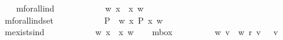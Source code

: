 \begin{isabellebody}
\ \ \isamarkupfalse%
\ mforall{\isacharunderscore}ind\ {\isacharcolon}{\isacharcolon}\ {\isachardoublequoteopen}{\isacharparenleft}{\isasymmu}\ {\isasymRightarrow}\ {\isasymsigma}{\isacharparenright}\ {\isasymRightarrow}\ {\isasymsigma}{\isachardoublequoteclose}\ {\isacharparenleft}{\isachardoublequoteopen}{\isasymforall}{\isachardoublequoteclose}{\isacharparenright}\ \ {\isachardoublequoteopen}{\isasymforall}\ {\isasymPhi}\ {\isasymequiv}\ {\isacharparenleft}{\isasymlambda}w{\isachardot}\ {\isasymforall}x{\isachardot}\ {\isasymPhi}\ x\ w{\isacharparenright}{\isachardoublequoteclose}\ \ \ \isanewline
\ \ \isamarkupfalse%
\ mforall{\isacharunderscore}indset\ {\isacharcolon}{\isacharcolon}\ {\isachardoublequoteopen}{\isacharparenleft}{\isacharparenleft}{\isasymmu}\ {\isasymRightarrow}\ {\isasymsigma}{\isacharparenright}\ {\isasymRightarrow}\ {\isasymsigma}{\isacharparenright}\ {\isasymRightarrow}\ {\isasymsigma}{\isachardoublequoteclose}\ {\isacharparenleft}{\isachardoublequoteopen}{\isasymPi}{\isachardoublequoteclose}{\isacharparenright}\ \ {\isachardoublequoteopen}{\isasymPi}\ P\ {\isasymequiv}\ {\isacharparenleft}{\isasymlambda}w{\isachardot}\ {\isasymforall}x{\isachardot}\ P\ x\ w{\isacharparenright}{\isachardoublequoteclose}\isanewline
\ \ \isamarkupfalse%
\ mexists{\isacharunderscore}ind\ {\isacharcolon}{\isacharcolon}\ {\isachardoublequoteopen}{\isacharparenleft}{\isasymmu}\ {\isasymRightarrow}\ {\isasymsigma}{\isacharparenright}\ {\isasymRightarrow}\ {\isasymsigma}{\isachardoublequoteclose}\ {\isacharparenleft}{\isachardoublequoteopen}{\isasymexists}{\isachardoublequoteclose}{\isacharparenright}\ \ {\isachardoublequoteopen}{\isasymexists}\ {\isasymPhi}\ {\isasymequiv}\ {\isacharparenleft}{\isasymlambda}w{\isachardot}\ {\isasymexists}x{\isachardot}\ {\isasymPhi}\ x\ w{\isacharparenright}{\isachardoublequoteclose}\isanewline
\ \ \isamarkupfalse%
\ mbox\ {\isacharcolon}{\isacharcolon}\ {\isachardoublequoteopen}{\isasymsigma}\ {\isasymRightarrow}\ {\isasymsigma}{\isachardoublequoteclose}\ {\isacharparenleft}{\isachardoublequoteopen}{\isasymbox}{\isachardoublequoteclose}{\isacharparenright}\ \ {\isachardoublequoteopen}{\isasymbox}\ {\isasymphi}\ {\isasymequiv}\ {\isacharparenleft}{\isasymlambda}w{\isachardot}\ {\isasymforall}v{\isachardot}\ {\isasymnot}\ w\ r\ v\ {\isasymor}\ {\isasymphi}\ v{\isacharparenright}{\isachardoublequoteclose}\isanewline
\ \ \isamarkupfalse%

\end{isabellebody}
